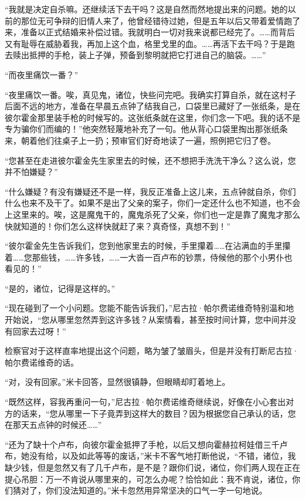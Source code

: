 \par “我就是决定自杀嘛。还继续活下去干吗？这是自然而然地提出来的问题。她的以前的那位无可争辩的旧情人来了，他曾经错待过她，但是五年以后又带着爱情跑了来，准备以正式结婚来补偿过错。我就明白一切对我来说都已经完了。……而背后又有耻辱在威胁着我，再加上这个血，格里戈里的血。……再活下去干吗？于是跑去赎出抵押的手枪，装上子弹，预备到黎明就把它打进自己的脑袋。……”
\par “而夜里痛饮一番？”
\par “夜里痛饮一番。唉，真见鬼，诸位，快些问完吧。我确实打算自杀，就在这村子后面不远的地方，准备在早晨五点钟了结我自己，口袋里已藏好了一张纸条，是在彼尔霍金那里装手枪的时候写的。这张纸条就在这里，你们念一下吧。我的话不是专为骗你们而编的！”他突然轻蔑地补充了一句。他从背心口袋里掏出那张纸条来，朝着他们往桌子上一扔；预审官们好奇地读了一遍，照例把它归了卷。
\par “您甚至在走进彼尔霍金先生家里去的时候，还不想把手洗洗干净么？这么说，您并不怕嫌疑？”
\par “什么嫌疑？有没有嫌疑还不是一样，我反正准备上这儿来，五点钟就自杀，你们什么也来不及干了。如果不是出了父亲的案子，你们一定还什么也不知道，也不会上这里来的。唉，这是魔鬼干的，魔鬼杀死了父亲，你们也一定是靠了魔鬼才那么快就知道的！你们怎么这样快就赶了来？真奇怪，真想不到！”
\par “彼尔霍金先生告诉我们，您到他家里去的时候，手里攥着……在沾满血的手里攥着……您那些钱，……许多钱，……一大沓一百卢布的钞票，侍候他的那个小男仆也看见的！”
\par “是的，诸位，记得是这样的。”
\par “现在碰到了一个小问题。您能不能告诉我们，”尼古拉·帕尔费诺维奇特别温和地开始说，“您从哪里忽然弄到这许多钱？从案情看，甚至按时间计算，您中间并没有回家去过呀！”
\par 检察官对于这样直率地提出这个问题，略为皱了皱眉头，但是并没有打断尼古拉·帕尔费诺维奇的话。
\par “对，没有回家。”米卡回答，显然很镇静，但眼睛却盯着地上。
\par “既然这样，容我再重问一句，”尼古拉·帕尔费诺维奇继续说，好像在小心套出对方的话来，“您从哪里一下子竟弄到这样大的数目？因为根据您自己承认的话，您在那天五点钟的时候还……”
\par “还为了缺十个卢布，向彼尔霍金抵押了手枪，以后又想向霍赫拉柯娃借三千卢布，她没有给，以及如此等等的废话，”米卡不客气地打断他说，“不错，诸位，我缺少钱，但是忽然又有了几千卢布，是不是？跟你们说，诸位，你们两人现在正在提心吊胆：万一不肯说从哪里来的，可怎么办呢？恰恰如此：我不肯说，诸位，你们猜对了，你们没法知道的。”米卡忽然用异常坚决的口气一字一句地说。
